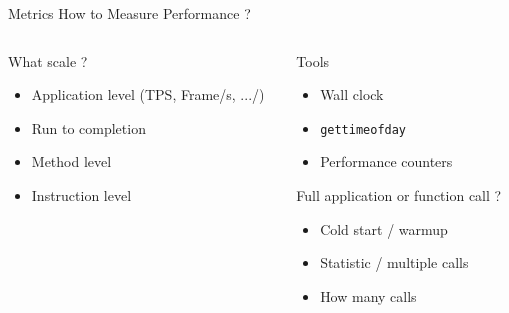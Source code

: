 %
\begin{Frame}{Metrics How to Measure Performance ?}
  \begin{columns}[t]
    \begin{column}{\BW} %
      \begin{block}{What scale ?}
        \begin{itemize}
        \item Application level (TPS, Frame/s, .../)
        \item Run to completion
        \item Method level
        \item Instruction level
        \end{itemize}
      \end{block} 
    \end{column}
    
    \begin{column}{\BW} %
      \begin{block}{Tools}
        \begin{itemize}
        \item Wall clock
        \item \texttt{gettimeofday}
        \item Performance counters
        \end{itemize}
      \end{block}   
      \begin{alertblock}{Full application or function call ?}
        \begin{itemize}
        \item Cold start / warmup\TBD
        \item Statistic / multiple calls
        \item How many calls
        \end{itemize}
      \end{alertblock}
    \end{column}
  \end{columns}  
\end{Frame}


